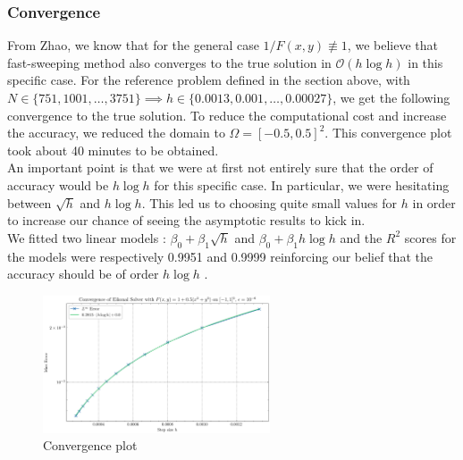 \documentclass[11pt]{article}
\theoremstyle{definition}
\theoremstyle{remark}
\begin{document}
\subsubsection{Convergence}
From Zhao, we know that for the general case $1/F(x,y)\not\equiv1$, we believe that fast-sweeping method also converges to the true solution in $\mathcal{O}(h\log h)$ in this specific case. For the reference problem defined in the section above, with $N\in\{751,1001,\dots,3751\}\implies h\in\{0.0013,0.001,\dots,0.00027\}$, we get the following convergence to the true solution. To reduce the computational cost and increase the accuracy, we reduced the domain to $\Omega=[-0.5,0.5]^2$. This convergence plot took about 40 minutes to be obtained. \\
An important point is that we were at first not entirely sure that the order of accuracy would be $h\log h$ for this specific case. In particular, we were hesitating between $\sqrt{h}$ and $h\log h$. This led us to choosing quite small values for $h$ in order to increase our chance of seeing the asymptotic results to kick in. \\
We fitted two linear models : $\beta_0+\beta_1\sqrt{h}$ and $\beta_0+\beta_1h\log h$ and the $R^2$ scores for the models were respectively 0.9951 and 0.9999 reinforcing our belief that the accuracy should be of order $h\log h$
.
\begin{figure}[h]
  \centering
  \includegraphics[width=0.6\textwidth]{plots/convergence2d_atan_step_size.png}
  \caption{Convergence plot}
  \label{fig:convarctan}
\end{figure}

\vspace{10pt}



\newpage
\end{document}
